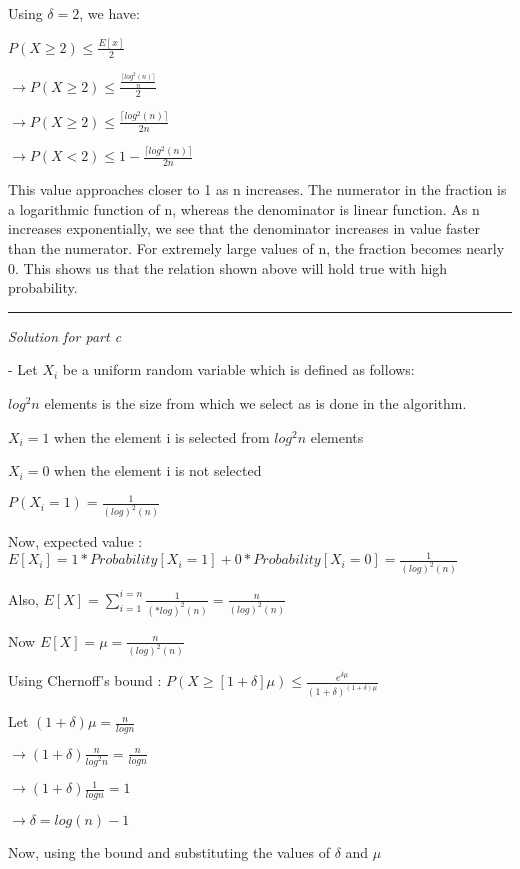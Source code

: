 \documentclass[11pt]{article}
\begin{document}
Using $\delta = 2$, we have:

$P(X\geq 2 ) \leq \frac{E[x]}{2}$

$\longrightarrow P(X\geq 2 ) \leq \frac{\frac{\lceil log^2 (n)\rceil}{n}}{2}$

$\longrightarrow P(X\geq 2 ) \leq \frac{\lceil log^2 (n)\rceil}{2n}$

$\longrightarrow P(X < 2 ) \leq 1 - \frac{\lceil log^2 (n)\rceil}{2n}$

This value approaches closer to 1 as n increases. The numerator in the fraction is a logarithmic function of n, whereas the denominator is linear function. As n increases exponentially, we see that the denominator increases in value faster than the numerator. For extremely large values of n, the fraction becomes nearly 0. This shows us that the relation shown above will hold true with high probability.

\medskip

\noindent\rule{8cm}{0.4pt}

\medskip

\textit{Solution for part c}

\medskip

- Let $X_i$ be a uniform random variable which is defined as follows:

$log^2 n$ elements is the size from which we select as is done in the algorithm.

$X_i = 1$ when the element i is selected from $log^2 n$ elements

$X_i = 0$ when the element i is not selected

$P(X_i = 1) = \frac{1}{(log)^2 (n)}$

Now, expected value : $E[X_i] = 1*Probability[X_i = 1] + 0*Probability[X_i = 0] = \frac{1}{(log)^2 (n)}$

Also, $E[X] = \sum_{i=1}^{i=n} \frac{1}{(*log)^2 (n)} = \frac{n}{(log)^2 (n)}$

Now $E[X] = \mu = \frac{n}{(log)^2 (n)}$

Using Chernoff's bound : $P(X\geq [1+\delta]\mu) \leq \frac{e^{\delta \mu}}{(1+\delta)^{(1+\delta)\mu}}$

Let $(1+\delta)\mu = \frac{n}{log n}$

$\longrightarrow (1+\delta)\frac{n}{log^2 n} = \frac{n}{log n}$

$\longrightarrow (1+\delta)\frac{1}{log n} = 1$

$\longrightarrow \delta = log (n) -1$

Now, using the bound and substituting the values of $\delta$ and $\mu$
\end{document}
